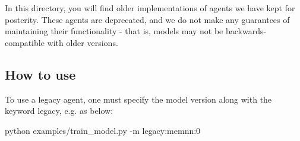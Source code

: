 In this directory, you will find older implementations of agents we have kept for posterity. These agents are deprecated, and we do not make any guarantees of maintaining their functionality -\/ that is, models may not be backwards-\/compatible with older versions.

\subsection*{How to use}

To use a legacy agent, one must specify the model version along with the keyword {\ttfamily legacy}, e.\+g. as below\+: 
\begin{DoxyCode}
python examples/train\_model.py -m legacy:memnn:0
\end{DoxyCode}
 